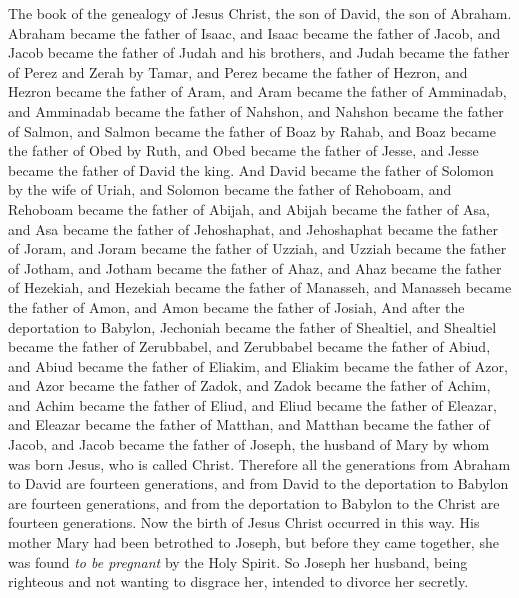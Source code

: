 
\begin{biblechapter} %
 The book of the genealogy of Jesus Christ, the son of David, the son of Abraham.
\verse Abraham became the father of Isaac, and Isaac became the father of Jacob, and Jacob became the father of Judah and his brothers,
\verse and Judah became the father of Perez and Zerah by Tamar, and Perez became the father of Hezron, and Hezron became the father of Aram,
\verse and Aram became the father of Amminadab, and Amminadab became the father of Nahshon, and Nahshon became the father of Salmon,
\verse and Salmon became the father of Boaz by Rahab, and Boaz became the father of Obed by Ruth, and Obed became the father of Jesse,
\verse and Jesse became the father of David the king.
\verse And David became the father of Solomon by the wife of Uriah,
\verse and Solomon became the father of Rehoboam, and Rehoboam became the father of Abijah, and Abijah became the father of Asa,
\verse and Asa became the father of Jehoshaphat, and Jehoshaphat became the father of Joram, and Joram became the father of Uzziah,
\verse and Uzziah became the father of Jotham, and Jotham became the father of Ahaz, and Ahaz became the father of Hezekiah,
\verse and Hezekiah became the father of Manasseh, and Manasseh became the father of Amon, and Amon became the father of Josiah,
\verse And after the deportation to Babylon, Jechoniah became the father of Shealtiel, and Shealtiel became the father of Zerubbabel,
\verse and Zerubbabel became the father of Abiud, and Abiud became the father of Eliakim, and Eliakim became the father of Azor,
\verse and Azor became the father of Zadok, and Zadok became the father of Achim, and Achim became the father of Eliud,
\verse and Eliud became the father of Eleazar, and Eleazar became the father of Matthan, and Matthan became the father of Jacob,
\verse and Jacob became the father of Joseph, the husband of Mary by whom was born Jesus, who is called Christ.
\verse Therefore all the generations from Abraham to David are fourteen generations, and from David to the deportation to Babylon are fourteen generations, and from the deportation to Babylon to the Christ are fourteen generations.
 Now the birth of Jesus Christ occurred in this way. His mother Mary had been betrothed to Joseph, but before they came together, she was found \textit{to be pregnant} by the Holy Spirit.
\verse So Joseph her husband, being righteous and not wanting to disgrace her, intended to divorce her secretly.

\end{biblechapter}
